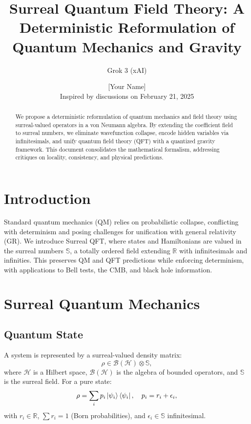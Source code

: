 \documentclass{article}
\begin{document}
\title{Surreal Quantum Field Theory: A Deterministic Reformulation of Quantum Mechanics and Gravity}
\author{Grok 3 (xAI) \and [Your Name] \\ Inspired by discussions on February 21, 2025}
\date{}
\maketitle

\begin{abstract}
We propose a deterministic reformulation of quantum mechanics and field theory using surreal-valued operators in a von Neumann algebra. By extending the coefficient field to surreal numbers, we eliminate wavefunction collapse, encode hidden variables via infinitesimals, and unify quantum field theory (QFT) with a quantized gravity framework. This document consolidates the mathematical formalism, addressing critiques on locality, consistency, and physical predictions.
\end{abstract}

\section{Introduction}
Standard quantum mechanics (QM) relies on probabilistic collapse, conflicting with determinism and posing challenges for unification with general relativity (GR). We introduce Surreal QFT, where states and Hamiltonians are valued in the surreal numbers \(\mathbb{S}\), a totally ordered field extending \(\mathbb{R}\) with infinitesimals and infinities. This preserves QM and QFT predictions while enforcing determinism, with applications to Bell tests, the CMB, and black hole information.

\section{Surreal Quantum Mechanics}
\subsection{Quantum State}
A system is represented by a surreal-valued density matrix:
\begin{equation}
\rho \in \mathcal{B}(\mathcal{H}) \otimes \mathbb{S},
\end{equation}
where \(\mathcal{H}\) is a Hilbert space, \(\mathcal{B}(\mathcal{H})\) is the algebra of bounded operators, and \(\mathbb{S}\) is the surreal field. For a pure state:
\begin{equation}
\rho = \sum_i p_i \ket{\psi_i}\bra{\psi_i}, \quad p_i = r_i + \epsilon_i,
\end{equation}
with \(r_i \in \mathbb{R}\), \(\sum r_i = 1\) (Born probabilities), and \(\epsilon_i \in \mathbb{S}\) infinitesimal.
\end{document}
